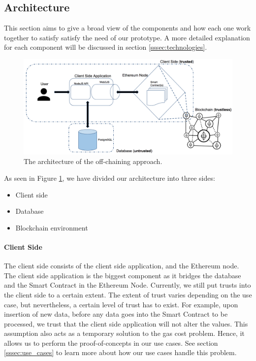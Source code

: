 \subsection{Architecture}

This section aims to give a broad view of the components and how each one work together to satisfy satisfy the need of our prototype. A more detailed explanation for each component will be discussed in section \ref{sssec:technologies}. 

\begin{figure}[t]%
\centering
\includegraphics[width=1.0\textwidth]{images/architecture.png}
\caption{\label{fig:architecture}The architecture of the off-chaining approach.}
\end{figure}

As seen in Figure \ref{fig:architecture}, we have divided our architecture into three sides: 
\begin{itemize}
\item Client side
\item Database
\item Blockchain environment
\end{itemize}

\paragraph{Client Side}
The client side consists of the client side application, and the Ethereum node. The client side application is the biggest component as it bridges the database and the Smart Contract in the Ethereum Node. Currently, we still put trusts into the client side to a certain extent. The extent of trust varies depending on the use case, but nevertheless, a certain level of trust has to exist. For example, upon insertion of new data, before any data goes into the Smart Contract to be processed, we trust that the client side application will not alter the values. This assumption also acts as a temporary solution to the gas cost problem. Hence, it allows us to perform the proof-of-concepts in our use cases. See section \ref{sssec:use_cases} to learn more about how our use cases handle this problem.



